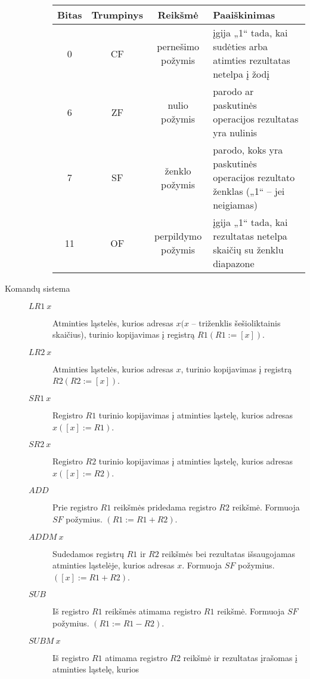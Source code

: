 \begin{description}
\begin{description}
        \begin{tabularx}{0.85\textwidth}{|c|c|c|X|} 
          \hline
          Bitas & Trumpinys & Reikšmė & Paaiškinimas \\
          \hline
          0 & CF & pernešimo požymis & įgija „1“ tada, kai sudėties arba
          atimties rezultatas netelpa į žodį \\
          \hline
          6 & ZF & nulio požymis & parodo ar paskutinės operacijos 
          rezultatas yra nulinis \\
          \hline
          7 & SF & ženklo požymis & parodo, koks yra paskutinės operacijos 
          rezultato ženklas („1“ – jei neigiamas) \\
          \hline
          11 & OF & perpildymo požymis & įgija „1“ tada, kai rezultatas
          netelpa skaičių su ženklu diapazone \\
          \hline
        \end{tabularx}
    \end{description}
  \item[Komandų sistema] \hfill
    \begin{description} 
        \item[$LR1 \: x$] Atminties ląstelės, kurios adresas 
          $x (x $ – triženklis šešioliktainis skaičius), 
          turinio kopijavimas į registrą $R1 (R1:=[x])$.
        \item[$LR2 \: x$] Atminties ląstelės, kurios adresas 
          $x$, turinio kopijavimas į registrą $R2 (R2:=[x])$.
        \item[$SR1 \: x$] Registro $R1$ turinio kopijavimas į atminties 
          ląstelę, kurios adresas $x ([x]:=R1)$.
        \item[$SR2 \: x$] Registro $R2$ turinio kopijavimas į atminties 
          ląstelę, kurios adresas $x ([x]:=R2)$.
        \item[$ADD$] Prie registro $R1$ reikšmės pridedama registro $R2$ 
          reikšmė. Formuoja $SF$ požymius. $(R1:=R1+R2)$.
        \item[$ADDM \: x$] Sudedamos registrų $R1$ ir $R2$ reikšmės bei 
          rezultatas išsaugojamas atminties ląstelėje, kurios adresas 
          $x$. Formuoja $SF$ požymius. $([x]:=R1+R2)$.
        \item[$SUB$] Iš registro $R1$ reikšmės atimama registro $R1$ 
          reikšmė. Formuoja $SF$ požymius. $(R1:=R1-R2)$.
        \item[$SUBM \: x$] Iš registro $R1$ atimama registro $R2$ 
          reikšmė ir rezultatas įrašomas į atminties ląstelę, kurios 

\end{description}
\end{description}
